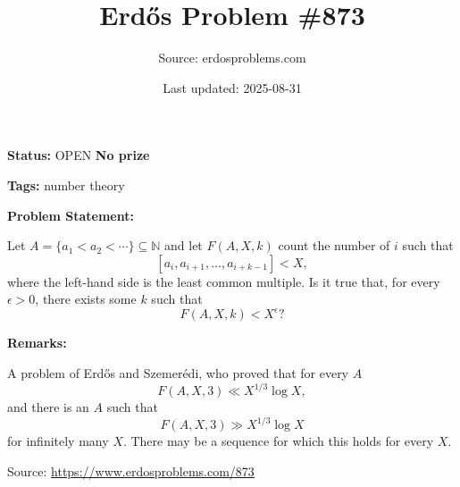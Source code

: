 \documentclass{article}
\title{Erd\H{o}s Problem \#873}
\date{Last updated: 2025-08-31}
\author{Source: erdosproblems.com}
\begin{document}
\maketitle

\noindent\textbf{Status:} OPEN \quad \textbf{No prize}

\noindent\textbf{Tags:} number theory

\medskip
\noindent\textbf{Problem Statement:}

Let $A=\{a_1<a_2<\cdots\}\subseteq \mathbb{N}$ and let $F(A,X,k)$ count the number of $i$ such that\[[a_i,a_{i+1},\ldots,a_{i+k-1}] < X,\]where the left-hand side is the least common multiple. Is it true that, for every $\epsilon >0$, there exists some $k$ such that\[F(A,X,k)<X^\epsilon?\]

\bigskip
\noindent\textbf{Remarks:}

A problem of Erd\H{o}s and Szemer\'{e}di, who proved that for every $A$\[F(A,X,3) \ll X^{1/3}\log X,\]and there is an $A$ such that\[F(A,X,3) \gg X^{1/3}\log X\]for infinitely many $X$. There may be a sequence for which this holds for every $X$.

\bigskip
\noindent\small{Source: \url{https://www.erdosproblems.com/873}}
\end{document}
